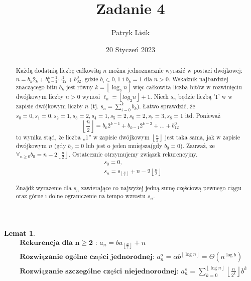 \documentclass[12pt]{article}
\title{Zadanie 4}
\author{Patryk Lisik}
\date{\(20\) Styczeń  2023}
\newcommand{\floor}[1]{\left\lfloor #1  \right\rfloor}
\begin{document}
\markboth{\theauthor}{\thetitle}

\maketitle
\newtheorem{lemma}{Lemat}

\begin{abstract}
Każdą dodatnią liczbę całkowitą $n$ można jednoznacznie wyrazić w postaci dwójkowej: $n=b_k2_k+b_{k-1}^{k-1}\dotsb_12^1+b_02^0$, gdzie $b_i \in {0,1}$ i $b_k=1$ dla $n>0$.
Wskaźnik najbardziej znaczącego bitu $b_k$ jest równy $k=\floor{\log_2 n}$ więc całkowita liczba bitów w rozwinięciu dwójkowym liczby $n>0$ wynosi $\ell_n =\floor{log_2n}+1$.
Niech $s_n$ będzie liczbą '1' w w zapisie dwójkowym liczby $n$ (tj. $s_n = \sum^k_{i=0}b_k $).
Łatwo sprawdzić, że $s_0=0 ,s_1=0, s_2=1, s_3=2, s_4=1,s_5=2,s_6=2, s_7=3, s_8=1$ itd. Ponieważ 
$$ \floor{\frac{n}{2}}=b_k2^{k-1}+b_{k-1}2^{k-2}+\dots+b_12^0$$
to wynika stąd, że liczba „1” w zapisie dwójkowym $\floor{\frac{n}{2}}$ jest taka sama, jak w zapisie dwójkowym $n$ (gdy $b_0=0$ lub jest o jeden mniejsza(gdy $b_0=0$).
Zauważ, ze $\forall_{n\ge 0} b_0 = n-2\floor{\frac{n}{2}}$.
Ostatecznie otrzymujemy związek rekurencyjny.
\begin{align*}
    &s_0=0, \\
    &s_n = s_{\floor{\frac{n}{2}}} + n - 2\floor{\frac{n}{2}}
\end{align*}

Znajdź wyrażenie dla $s_n$ zawierające co najwyżej jedną
sumę częściową pewnego ciągu oraz górne i dolne ograniczenie na tempo wzrostu $s_n$.


\end{abstract}



\begin{lemma}

\begin{align*}
    &\textbf{Rekurencja dla n} \ge \textbf{2 : }  a_n = ba_{\floor{\frac{n}{2}}}+n \\
    &\textbf{Rozwiązanie ogólne części jednorodnej: }  a^o_n=\alpha b^{\floor{\log n}}=\Theta(n^{\log b}) \\
    & \textbf{Rozwiązanie szczególne części niejednorodnej: }  a^s_n=\sum^{\floor{\log n}}_{k=0} \floor{\frac{n}{2^k}}b^k
\end{align*}

\end{lemma}
\end{document}
